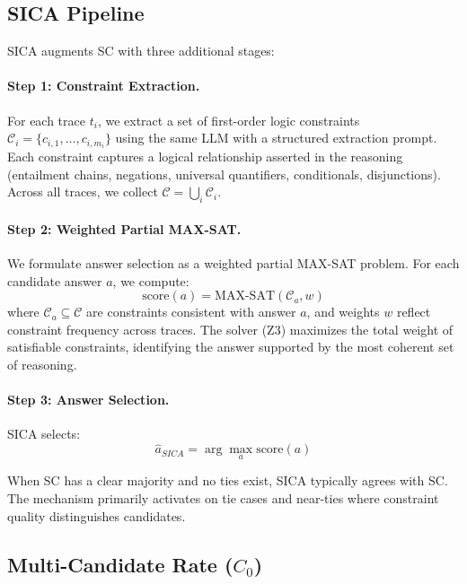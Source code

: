 \documentclass[11pt]{article}
\begin{document}
\subsection{SICA Pipeline}

SICA augments SC with three additional stages:

\paragraph{Step 1: Constraint Extraction.} For each trace $t_i$, we extract a set of first-order logic constraints $\mathcal{C}_i = \{c_{i,1}, \ldots, c_{i,m_i}\}$ using the same LLM with a structured extraction prompt. Each constraint captures a logical relationship asserted in the reasoning (entailment chains, negations, universal quantifiers, conditionals, disjunctions). Across all traces, we collect $\mathcal{C} = \bigcup_i \mathcal{C}_i$.

\paragraph{Step 2: Weighted Partial MAX-SAT.} We formulate answer selection as a weighted partial MAX-SAT problem. For each candidate answer $a$, we compute:
\begin{equation}
    \text{score}(a) = \text{MAX-SAT}(\mathcal{C}_a, w)
\end{equation}
where $\mathcal{C}_a \subseteq \mathcal{C}$ are constraints consistent with answer $a$, and weights $w$ reflect constraint frequency across traces. The solver (Z3) maximizes the total weight of satisfiable constraints, identifying the answer supported by the most coherent set of reasoning.

\paragraph{Step 3: Answer Selection.} SICA selects:
\begin{equation}
    \hat{a}_{SICA} = \arg\max_a \text{score}(a)
\end{equation}

When SC has a clear majority and no ties exist, SICA typically agrees with SC. The mechanism primarily activates on tie cases and near-ties where constraint quality distinguishes candidates.

\subsection{Multi-Candidate Rate ($C_0$)}
\end{document}
